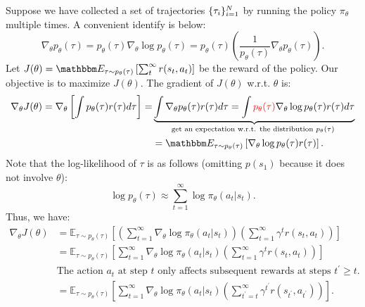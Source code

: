 Suppose we have collected a set of trajectories $\{ \tau_i \}_{i=1}^{N}$ by running the policy $\pi_{\theta}$ multiple times.
A convenient identify is below:
    \begin{equation}
        \nabla_\theta p_\theta(\tau) = p_{\theta}(\tau)\nabla_{\theta}\log p_{\theta}(\tau) =  p_\theta(\tau) \left( \frac{1}{p_\theta(\tau)} \nabla_\theta p_\theta(\tau) \right).
    \end{equation}
Let $J(\theta) = \E_{\tau \sim p_\theta(\tau)}\left[ \sum_{t}^{\infty}{r(s_t, a_t)} \right]$ be the reward of the policy.
Our objective is to maximize $J(\theta)$.
The gradient of $J(\theta)$ w.r.t. $\theta$ is:
    \begin{equation}
        \begin{aligned}
         \nabla_\theta J(\theta) = \nabla_\theta \left[ \int p_\theta(\tau) r(\tau) d\tau \right] = & \underbrace{ \int \nabla_\theta p_\theta(\tau) r(\tau) d\tau    = \int \textcolor{red}{p_{\theta}(\tau)} \nabla_{\theta}\log p_{\theta}(\tau)  r(\tau) d\tau }_{\text{get an expectation w.r.t. the distribution $p_{\theta}(\tau)$ }} \\
         & = \E_{\tau \sim p_\theta(\tau)} \left[ \nabla_\theta \log p_\theta(\tau) r(\tau) \right].
        \end{aligned}
    \end{equation}
Note that the log-likelihood of $\tau$ is as follows (omitting $p(s_1)$ because it does not involve $\theta$):
    \begin{equation}
        \log p_\theta(\tau) \approx \sum_{t=1}^{\infty}{\log \pi_{\theta}(a_t | s_t)}.
    \end{equation}
Thus, we have:
\begin{equation}
    \begin{aligned}
        \nabla_\theta J(\theta) & = \mathbb{E}_{\tau \sim p_\theta(\tau)}\left[ \left( \sum_{t=1}^{\infty} \nabla_\theta \log \pi_{\theta}(a_t | s_t) \right) \left( \sum_{t=1}^{\infty} \gamma^t r(s_t, a_t) \right) \right] \\
        & = \mathbb{E}_{\tau \sim p_\theta(\tau)}\left[ \sum_{t=1}^{\infty} \nabla_\theta \log \pi_{\theta}(a_t | s_t) \left( \sum_{t=1}^{\infty} \gamma^t r(s_t, a_t) \right) \right] \\
        & \text{The action $a_t$ at step $t$ only affects subsequent rewards at steps $t^\prime \ge t$.} \\ 
        & = \mathbb{E}_{\tau \sim p_\theta(\tau)}\left[ \sum_{t=1}^{\infty} \nabla_\theta \log \pi_{\theta}(a_t | s_t) \left( \sum_{t^\prime = t}^{\infty} \gamma^{t^\prime} r(s_{t^\prime}, a_{t^\prime}) \right) \right].
    \end{aligned}
\end{equation}


